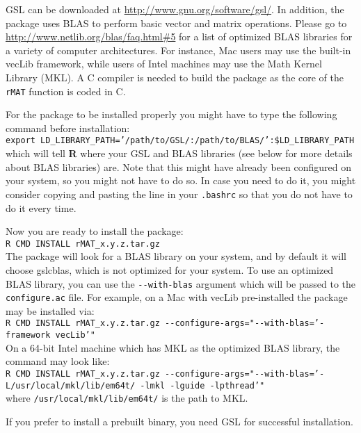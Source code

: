 \documentclass[11pt]{article}
\begin{document}
GSL can be downloaded at \url{http://www.gnu.org/software/gsl/}.  In addition, the package uses BLAS to perform basic vector and matrix operations.  Please go to \url{http://www.netlib.org/blas/faq.html#5} for a list of optimized BLAS libraries for a variety of computer architectures.  For instance, Mac users may use the built-in vecLib framework, while users of Intel machines may use the Math Kernel Library (MKL).  A C compiler is needed to build the package as the core of the \texttt{rMAT} function is coded in C.

For the package to be installed properly you might have to type the following command before installation:\\[6pt]
\texttt{export LD\_LIBRARY\_PATH='/path/to/GSL/:/path/to/BLAS/':\$LD\_LIBRARY\_PATH}\\[6pt]
which will tell {\bf R} where your GSL and BLAS libraries (see below for more details about BLAS libraries) are.  Note that this might have already been configured on your system, so you might not have to do so.  In case you need to do it, you might consider copying and pasting the line in your \texttt{.bashrc} so that you do not have to do it every time. 

Now you are ready to install the package: \\[6pt]
\texttt{R CMD INSTALL rMAT\_x.y.z.tar.gz}\\[6pt]
The package will look for a BLAS library on your system, and by default it will choose gslcblas, which is not optimized for your system.  To use an optimized BLAS library, you can use the \texttt{-{}-with-blas} argument which will be passed to the \texttt{configure.ac} file.  For example, on a Mac with vecLib pre-installed the package may be installed via: \\[6pt]
\texttt{R CMD INSTALL rMAT\_x.y.z.tar.gz -{}-configure-args="-{}-with-blas='-framework vecLib'"}\\[6pt]
On a 64-bit Intel machine which has MKL as the optimized BLAS library, the command may look like: \\[6pt]
\texttt{R CMD INSTALL rMAT\_x.y.z.tar.gz -{}-configure-args="-{}-with-blas='-L/usr/local/mkl/lib/em64t/ -lmkl -lguide -lpthread'"}\\[6pt]
where \texttt{/usr/local/mkl/lib/em64t/} is the path to MKL. 

If you prefer to install a prebuilt binary, you need GSL for successful installation.
\end{document}
